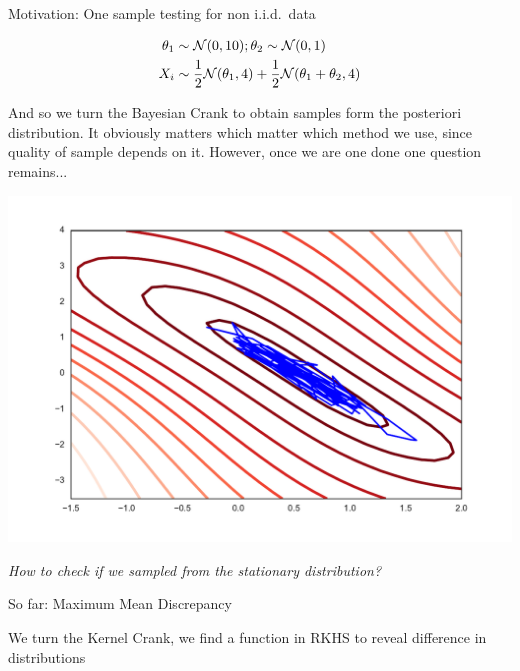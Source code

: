 


\begin{frame}
\begin{columns}
\begin{column}{.33\linewidth}
\begin{block}{Motivation: One sample testing for non i.i.d.\ data}
\begin{minipage}{.57\linewidth}

\begin{align*}
 \theta_{1}&\sim{\cal N}(0,10);\theta_{2}\sim{\cal N}(0,1) \\
 X_{i} &\sim\frac{1}{2}{\cal N}(\theta_{1},4)+\frac{1}{2}{\cal N}(\theta_{1}+\theta_{2},4)
\end{align*}
 \vspace{1cm} 

And so we turn the Bayesian Crank  to  obtain samples form the posteriori distribution. It obviously matters which matter which method we use, since quality of sample depends on it. However, once we are one  done one question remains...  
\end{minipage}
\begin{minipage}{.37\linewidth}
\includegraphics[scale=0.8]{../../presentation/img/sgld_trace_and_density.pdf}
\end{minipage}
\vspace{1cm}
\begin{center}
\Large
\emph{How to check if we sampled from the stationary distribution?}
\end{center}
\end{block}
\vspace{-0.75cm}
\begin{block}{So far: Maximum Mean Discrepancy}
\begin{center}We turn the Kernel Crank, we find a function in RKHS to reveal difference in distributions\end{center}
\begin{minipage}{.60\linewidth}



\end{minipage}
\end{block}
\end{column}
\end{columns}
\end{frame}
